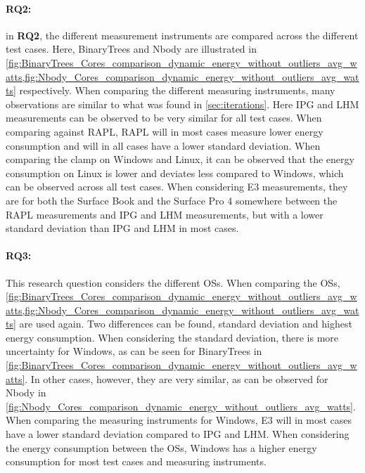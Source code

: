 \paragraph*{RQ2:}  in \textbf{RQ2}, the different measurement instruments are compared across the different test cases. Here, BinaryTrees and Nbody are illustrated in  \cref*{fig:BinaryTrees_Cores_comparison_dynamic_energy_without_outliers_avg_watts,fig:Nbody_Cores_comparison_dynamic_energy_without_outliers_avg_watts} respectively. When comparing the different measuring instruments, many observations are similar to what was found in \cref{sec:iterations}. Here IPG and LHM measurements can be observed to be very similar for all test cases. When comparing against RAPL, RAPL will in most cases measure lower energy consumption and will in all cases have a lower standard deviation. When comparing the clamp on Windows and Linux, it can be observed that the energy consumption on Linux is lower and deviates less compared to Windows, which can be observed across all test cases. When considering E3 measurements, they are for both the Surface Book and the Surface Pro 4 somewhere between the RAPL measurements and IPG and LHM measurements, but with a lower standard deviation than IPG and LHM in most cases.




\paragraph*{RQ3:} This research question considers the different OSs. When comparing the OSs, \cref*{fig:BinaryTrees_Cores_comparison_dynamic_energy_without_outliers_avg_watts,fig:Nbody_Cores_comparison_dynamic_energy_without_outliers_avg_watts} are used again. Two differences can be found, standard deviation and highest energy consumption. When considering the standard deviation, there is more uncertainty for Windows, as can be seen for BinaryTrees in \cref*{fig:BinaryTrees_Cores_comparison_dynamic_energy_without_outliers_avg_watts}. In other cases, however, they are very similar, as can be observed for Nbody in \cref*{fig:Nbody_Cores_comparison_dynamic_energy_without_outliers_avg_watts}. When comparing the measuring instruments for Windows, E3 will in most cases have a lower standard deviation compared to IPG and LHM. When considering the energy consumption between the OSs, Windows has a higher energy consumption for most test cases and measuring instruments.

